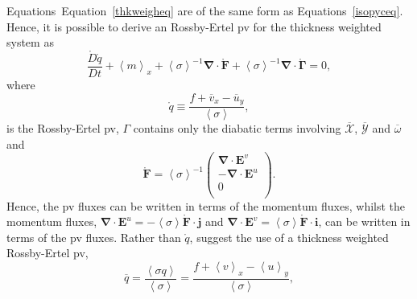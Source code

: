 \documentclass[12pt,a4paper]{report}
\newcommand*\thkmean[1]{\overline{#1}}
\newcommand*\nthkmean[1]{\left\langle{#1}\right\rangle}
\newcommand*\spec[1]{\mathring{#1}}
\newcommand*\equref[1]{Equation~\eqref{#1}}
\begin{document}
                      Equations~\equref{thkweigheq} are of the same form as Equations~\ref{isopyceq}.
                      Hence, it is possible to derive an
                      Rossby-Ertel \gls{pv} for the thickness weighted system
                      as
                      \begin{equation}
                      \frac{\spec{D} \spec{q}}{D t} + \nthkmean{m}_{x} 
                      +\nthkmean{\sigma}^{-1}\boldsymbol{\nabla}\cdot\spec{\boldsymbol{F}}
                      +\nthkmean{\sigma}^{-1}\boldsymbol{\nabla}\cdot\spec{\boldsymbol{\Gamma}}=0,
                      \end{equation} 
                      where
                      \begin{equation}
                      \spec{q}\equiv\frac{f+\thkmean{v}_{x}-\thkmean{u}_{y}}{\nthkmean{\sigma}},
                      \end{equation}
                      is the Rossby-Ertel \gls{pv}, $\Gamma$ contains only the diabatic terms involving $\thkmean{\mathcal{X}} $, $\thkmean{\mathcal{Y}} $ and $\thkmean{\omega} $ and 
                      \begin{equation}
                      \spec{\boldsymbol{F}}=\nthkmean{\sigma}^{-1}\left(
                      \begin{array}{c}
                      \boldsymbol{\nabla}\cdot\boldsymbol{E}^v \\
                      -\boldsymbol{\nabla}\cdot\boldsymbol{E}^u\\
                      0 \\
                      \end{array}\right).
                      \end{equation}
                      Hence, the \gls{pv} fluxes can be written in terms of
                      the momentum fluxes, whilst the momentum fluxes, ${\boldsymbol{\nabla}\cdot\boldsymbol{E}^u = -\nthkmean{\sigma} \spec{\boldsymbol{F}}\cdot\boldsymbol{j}}$ and                      ${\boldsymbol{\nabla}\cdot\boldsymbol{E}^v = \nthkmean{\sigma} \spec{\boldsymbol{F}}\cdot\boldsymbol{i}}$,
                      can be written in terms of the \gls{pv} fluxes.
                      Rather than $\spec{q}$, \cite{greatbatch1998exploring} suggest
                      the use of a thickness weighted Rossby-Ertel \gls{pv},
                      \begin{equation}
                      \thkmean{q}=\frac{\nthkmean{\sigma q}}{\nthkmean{\sigma}}=\frac{f+\nthkmean{v}_{x}-\nthkmean{u}_{y}}{\nthkmean{\sigma}},
                      \end{equation}
\end{document}
